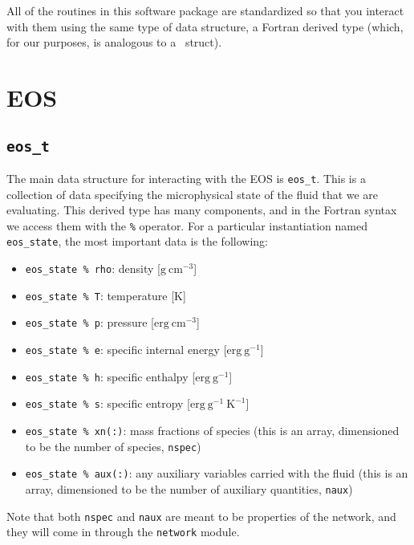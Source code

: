 \label{sec:data_structures}

All of the routines in this software package are standardized so that
you interact with them using the same type of data structure, a
Fortran derived type (which, for our purposes, is analogous to a
\cpp\ struct).

\section{EOS}

\subsection{{\tt eos\_t}}

The main data structure for interacting with the EOS is {\tt eos\_t}.
This is a collection of data specifying the microphysical state of the
fluid that we are evaluating.  This derived type has many components,
and in the Fortran syntax we access them with the {\tt \%} operator. For a
particular instantiation named {\tt eos\_state}, the most important
data is the following:
\begin{itemize}
  \item {\tt eos\_state \% rho}: density [$\mathrm{g~cm^{-3}}$]

  \item {\tt eos\_state \% T}: temperature [K]

  \item {\tt eos\_state \% p}: pressure [$\mathrm{erg~cm^{-3}}$]

  \item {\tt eos\_state \% e}: specific internal energy [$\mathrm{erg~g^{-1}}$]

  \item {\tt eos\_state \% h}: specific enthalpy [$\mathrm{erg~g^{-1}}$]

  \item {\tt eos\_state \% s}: specific entropy [$\mathrm{erg~g^{-1}~K^{-1}}$]

  \item {\tt eos\_state \% xn(:)}: mass fractions of species (this is an
    array, dimensioned to be the number of species, {\tt nspec})

  \item {\tt eos\_state \% aux(:)}: any auxiliary variables carried with
    the fluid (this is an array, dimensioned to be the number of 
    auxiliary quantities, {\tt naux})
\end{itemize}
Note that both {\tt nspec} and {\tt naux} are meant to be properties of the
network, and they will come in through the {\tt network} module.

